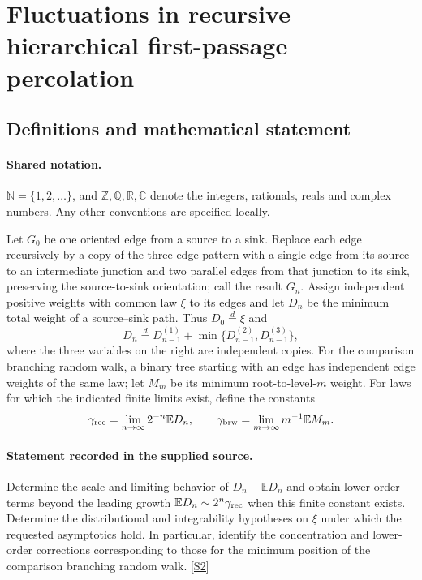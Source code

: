 \documentclass[11pt]{article}
\newcommand{\sref}[2]{\hyperlink{source:#1:#2}{[S#2]}}
\begin{document}
\section{Fluctuations in recursive hierarchical first-passage percolation}\label{statement}

\subsection{Definitions and mathematical statement}

\paragraph{Shared notation.}$\mathbb N=\{1,2,\ldots\}$, and $\mathbb Z,\mathbb Q,\mathbb R,\mathbb C$ denote the integers, rationals, reals and complex numbers. Any other conventions are specified locally.


Let $G_0$ be one oriented edge from a source to a sink. Replace each edge recursively by a copy of the three-edge pattern with a single edge from its source to an intermediate junction and two parallel edges from that junction to its sink, preserving the source-to-sink orientation; call the result $G_n$. Assign independent positive weights with common law $\xi$ to its edges and let $D_n$ be the minimum total weight of a source--sink path. Thus $D_0\stackrel d=\xi$ and
\[D_n\stackrel d=D_{n-1}^{(1)}+\min\{D_{n-1}^{(2)},D_{n-1}^{(3)}\},\]
where the three variables on the right are independent copies. For the comparison branching random walk, a binary tree starting with an edge has independent edge weights of the same law; let $M_m$ be its minimum root-to-level-$m$ weight. For laws for which the indicated finite limits exist, define the constants
\[\gamma_{\rm rec}=\lim_{n\to\infty}2^{-n}\mathbb E D_n,\qquad\gamma_{\rm brw}=\lim_{m\to\infty}m^{-1}\mathbb E M_m.\]
\paragraph{Statement recorded in the supplied source.}
Determine the scale and limiting behavior of $D_n-\mathbb E D_n$ and obtain lower-order terms beyond the leading growth $\mathbb E D_n\sim 2^n\gamma_{\rm rec}$ when this finite constant exists. Determine the distributional and integrability hypotheses on $\xi$ under which the requested asymptotics hold. In particular, identify the concentration and lower-order corrections corresponding to those for the minimum position of the comparison branching random walk. \sref{statement}{2}
\end{document}
